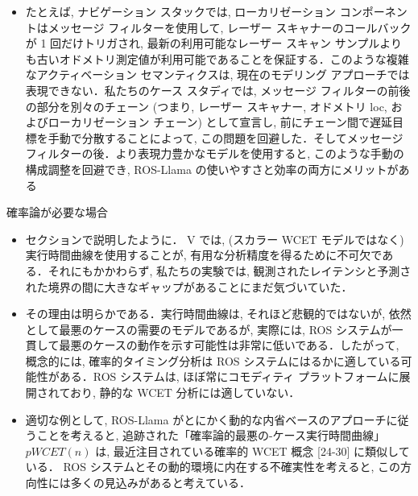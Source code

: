 \begin{frame}{}
    \begin{itemize}
        \item たとえば, ナビゲーション スタックでは, ローカリゼーション コンポーネントはメッセージ フィルターを使用して, レーザー スキャナーのコールバックが 1 回だけトリガされ, 最新の利用可能なレーザー スキャン サンプルよりも古いオドメトリ測定値が利用可能であることを保証する．このような複雑なアクティベーション セマンティクスは, 現在のモデリング アプローチでは表現できない．私たちのケース スタディでは, メッセージ フィルターの前後の部分を別々のチェーン (つまり, レーザー スキャナー, オドメトリ loc, およびローカリゼーション チェーン) として宣言し, 前にチェーン間で遅延目標を手動で分散することによって, この問題を回避した．そしてメッセージフィルターの後．より表現力豊かなモデルを使用すると, このような手動の構成調整を回避でき, ROS-Llama の使いやすさと効率の両方にメリットがある
    \end{itemize}
\end{frame}

\begin{frame}{確率論が必要な場合}
    \begin{itemize}
        \item セクションで説明したように． V では, (スカラー WCET モデルではなく) 実行時間曲線を使用することが, 有用な分析精度を得るために不可欠である．それにもかかわらず, 私たちの実験では, 観測されたレイテンシと予測された境界の間に大きなギャップがあることにまだ気づいていた．
    \end{itemize}
\end{frame}

\begin{frame}{}
    \begin{itemize}
        \item その理由は明らかである．実行時間曲線は, それほど悲観的ではないが, 依然として最悪のケースの需要のモデルであるが, 実際には, ROS システムが一貫して最悪のケースの動作を示す可能性は非常に低いである．したがって, 概念的には, 確率的タイミング分析は ROS システムにはるかに適している可能性がある．ROS システムは, ほぼ常にコモディティ プラットフォームに展開されており, 静的な WCET 分析には適していない．
    \end{itemize}
\end{frame}

\begin{frame}{}
    \begin{itemize}
        \item 適切な例として, ROS-Llama がとにかく動的な内省ベースのアプローチに従うことを考えると, 追跡された「確率論的最悪の-ケース実行時間曲線」 $p W C E T(n)$ は, 最近注目されている確率的 WCET 概念 [24-30] に類似している． ROS システムとその動的環境に内在する不確実性を考えると, この方向性には多くの見込みがあると考えている．
    \end{itemize}
\end{frame}

